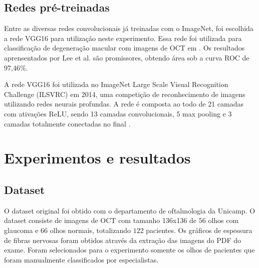 \documentclass[conference]{IEEEtran}
\begin{document}
  \subsection{Redes pré-treinadas}


  Entre as diversas redes convolucionais já treinadas com o ImageNet, foi escolhida a rede VGG16 para utilização neste experimento. Essa rede foi utilizada para classificação de degeneração macular com imagens de OCT em \cite{lee2017}. Os resultados aprensentados por Lee et al. são promissores, obtendo área sob a curva ROC de 97,46\%.

  A rede VGG16 foi utilizada no ImageNet Large Scale Visual Recognition Challenge (ILSVRC) em 2014, uma competição de reconhecimento de imagens utilizando redes neurais profundas. A rede é composta ao todo de 21 camadas com ativações ReLU, sendo 13 camadas convolucionais, 5 max pooling e 3 camadas totalmente conectadas no final \cite{simonyan2014}.

\section{Experimentos e resultados}



  \subsection{Dataset}


  O dataset original foi obtido com o departamento de oftalmologia da Unicamp. O dataset consiste de imagens de OCT com tamanho 136x136 de $56$ olhos com glaucoma e $66$ olhos normais, totalizando $122$ pacientes. Os gráficos de espessura de fibras nervosas foram obtidos através da extração das imagens do PDF do exame. Foram selecionados para o experimento somente os olhos de pacientes que foram manualmente classificados por especialistas.
\end{document}
